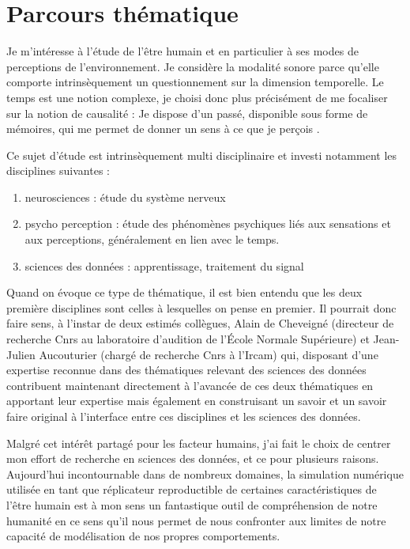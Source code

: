   \chapter{\nmu Parcours  thématique} \label{chap:themes}

  Je m'intéresse à l'étude de l'être humain et en particulier à ses modes de perceptions de l'environnement. Je considère la modalité sonore parce qu'elle comporte intrinsèquement un questionnement sur la dimension temporelle. Le temps est une notion complexe, je choisi donc plus précisément de me focaliser sur la notion de causalité : \og Je dispose d'un passé, disponible sous forme de mémoires, qui me permet de donner un sens à ce que je perçois \fg.

  Ce sujet d'étude est intrinsèquement multi disciplinaire et investi notamment les disciplines suivantes :
  \begin{enumerate}
    \item neurosciences : étude du système nerveux
    \item psycho perception : étude des phénomènes psychiques liés aux sensations et aux perceptions, généralement en lien avec le temps.
    \item sciences des données : apprentissage, traitement du signal
  \end{enumerate}

  Quand on évoque ce type de thématique, il est bien entendu que les deux première disciplines sont  celles à lesquelles on pense en premier. Il pourrait donc faire sens, à l'instar de deux estimés collègues, Alain de Cheveigné (directeur de recherche Cnrs au laboratoire d'audition de l'\'Ecole Normale Supérieure) et Jean-Julien Aucouturier (chargé de recherche Cnrs à l'Ircam) qui, disposant d'une expertise reconnue dans des thématiques relevant des sciences des données contribuent maintenant directement à l'avancée de ces deux thématiques en apportant leur expertise mais également en construisant un savoir et un savoir faire original à l'interface entre ces disciplines et les sciences des données.

  Malgré cet intérêt partagé pour les facteur humains, j'ai fait le choix de centrer mon effort de recherche en sciences des données, et ce pour plusieurs raisons. Aujourd'hui incontournable dans de nombreux domaines, la simulation numérique utilisée en tant que \og réplicateur reproductible \fg de certaines caractéristiques de l'être humain est à mon sens un fantastique outil de compréhension de notre humanité en ce sens qu'il nous permet de nous confronter aux limites de notre capacité de modélisation de nos propres comportements.


